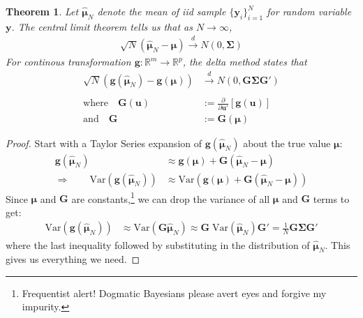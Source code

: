 \documentclass[12pt]{article}
\theoremstyle{plain}
\newtheorem{thm}{Theorem}[section]
\theoremstyle{definition}
\theoremstyle{remark}
\begin{document}
\begin{thm}
Let $\boldsymbol{\hat{\mu}}_N$ denote the mean of iid sample
$\{\boldsymbol{y}_i\}^N_{i=1}$ for random variable $\boldsymbol{y}$.
The central limit theorem tells us that as $N\rightarrow\infty$,
\begin{align*}
  \sqrt{N}\left(
  \boldsymbol{\hat{\mu}}_N
  -\boldsymbol{{\mu}}
  \right)
  \xrightarrow{d} N(0, \boldsymbol{\Sigma})
\end{align*}
For continous transformation
$\boldsymbol{g}:\mathbb{R}^m\rightarrow \mathbb{R}^p$, the
\emph{delta method} states that
\begin{align*}
  \sqrt{N}\left(
  \boldsymbol{g}(\boldsymbol{\hat{\mu}}_N)
  -
  \boldsymbol{g}(\boldsymbol{\mu})
  \right)
  &\xrightarrow{d} N\left(
    0, \boldsymbol{G} \boldsymbol{\Sigma} \boldsymbol{G'}
  \right)\\\\
  \text{where}\quad
  \boldsymbol{G}(\boldsymbol{u})
  &:=\frac{\partial}{\partial \boldsymbol{u'}}
  \left[\boldsymbol{g}(\boldsymbol{u})\right]\\
  \text{and} \quad
  \boldsymbol{G} &:= \boldsymbol{G}(\boldsymbol{\mu})
\end{align*}
\end{thm}
\begin{proof}
Start with a Taylor Series expansion of
$\boldsymbol{g}(\boldsymbol{\hat{\mu}}_N)$ about the true value
$\boldsymbol{\mu}$:
\begin{align*}
  \boldsymbol{g}(\boldsymbol{\hat{\mu}}_N)
  &\approx
  \boldsymbol{g}(\boldsymbol{\mu})
  + \boldsymbol{G}
  \left(
  \boldsymbol{\hat{\mu}}_N - \boldsymbol{\mu}
  \right)\\
  \Rightarrow\qquad
  \text{Var}\left(\boldsymbol{g}(\boldsymbol{\hat{\mu}}_N)\right)
  &\approx
  \text{Var}\left(\boldsymbol{g}(\boldsymbol{\mu})
  + \boldsymbol{G}
  \left(
  \boldsymbol{\hat{\mu}}_N - \boldsymbol{\mu}
  \right)
  \right)
\end{align*}
Since $\boldsymbol{\mu}$ and $\boldsymbol{G}$ are
constants,\footnote{Frequentist alert! Dogmatic Bayesians please avert
eyes and forgive my impurity.} we can drop the variance of all
$\boldsymbol{\mu}$ and $\boldsymbol{G}$ terms to get:
\begin{align*}
  \text{Var}\left(\boldsymbol{g}(\boldsymbol{\hat{\mu}}_N)\right)
  &\approx
  \text{Var}\left(
  \boldsymbol{G}
  \boldsymbol{\hat{\mu}}_N
  \right)
  \approx
  \boldsymbol{G}\;
  \text{Var}\left(
  \boldsymbol{\hat{\mu}}_N
  \right)
  \boldsymbol{G'}
  = \frac{1}{{N}}
  \boldsymbol{G}
  \boldsymbol{\Sigma}
  \boldsymbol{G'}
\end{align*}
where the last inequality followed by substituting in the distribution
of $\boldsymbol{\hat{\mu}}_N$. This gives us everything we need.
\end{proof}
\end{document}
